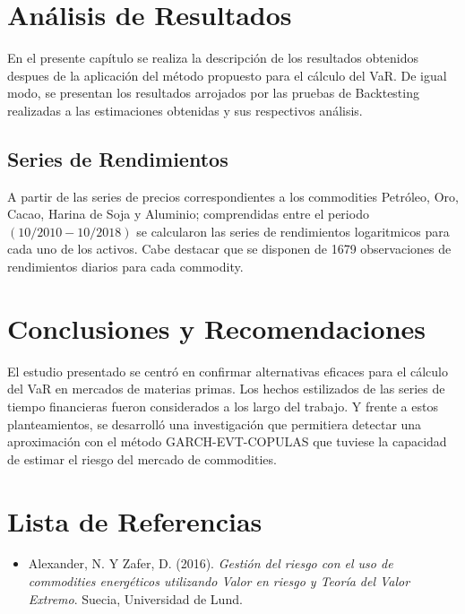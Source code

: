 \documentclass[a4paper,12pt]{Latex/Classes/PhDthesisPSnPDF}
\begin{document}
\chapter{Análisis de Resultados}

En el presente capítulo se realiza la descripción de los resultados obtenidos despues de la aplicación del método propuesto para el cálculo del VaR. De igual modo, se presentan los resultados arrojados por las pruebas de Backtesting realizadas a las estimaciones obtenidas y sus respectivos análisis.

\section{Series de Rendimientos}

A partir de las series de precios correspondientes a los commodities Petróleo, Oro, Cacao, Harina de Soja y  Aluminio; comprendidas entre el periodo $(10/2010 - 10/2018)$ se calcularon las series de rendimientos logaritmicos para cada uno de los activos. Cabe destacar que se disponen de 1679 observaciones de rendimientos diarios para cada commodity.






\chapter*{Conclusiones y Recomendaciones}

El estudio presentado se centró en confirmar alternativas eficaces para el cálculo del VaR en mercados de materias primas. Los hechos estilizados de las series de tiempo financieras fueron considerados a los largo del trabajo. Y frente a estos planteamientos, se desarrolló una investigación que permitiera detectar una aproximación con el método GARCH-EVT-COPULAS que tuviese la capacidad de estimar el riesgo del mercado de commodities.\\


\chapter*{Lista de Referencias}

\begin{itemize}

\item Alexander, N. Y Zafer, D. (2016). \textit{Gestión del riesgo con el uso de commodities energéticos utilizando Valor en riesgo y Teoría del Valor Extremo}. Suecia, Universidad de Lund.

\end{itemize}
\end{document}
